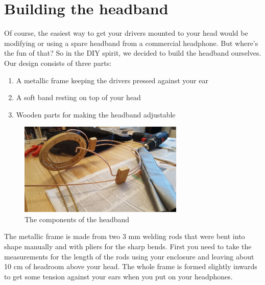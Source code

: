 \documentclass{article}
\begin{document}

\section{Building the headband}
\label{s:headband}
Of course, the easiest way to get your drivers mounted to your head would be modifying or using a spare headband from a commercial headphone. But where's the fun of that? So in the DIY spirit, we decided to build the headband ourselves.
Our design consists of three parts: 
\begin{enumerate}
\item A metallic frame keeping the drivers pressed against your ear
\item A soft band resting on top of your head
\item Wooden parts for making the headband adjustable
\end{enumerate}
\begin{figure}[htb]
    \centering
    \includegraphics[width=0.7\textwidth]{images/headband_frame.jpg}
    \caption{The components of the headband}
    \label{f:headband:frame}
\end{figure}
The metallic frame is made from two 3 mm welding rods that were bent into shape manually and with pliers for the sharp bends. First you need to take the measurements for the length of the rods using your enclosure and leaving about 10 cm of headroom above your head. The whole frame is formed slightly inwards to get some tension against your ears when you put on your headphones. 
\end{document}
